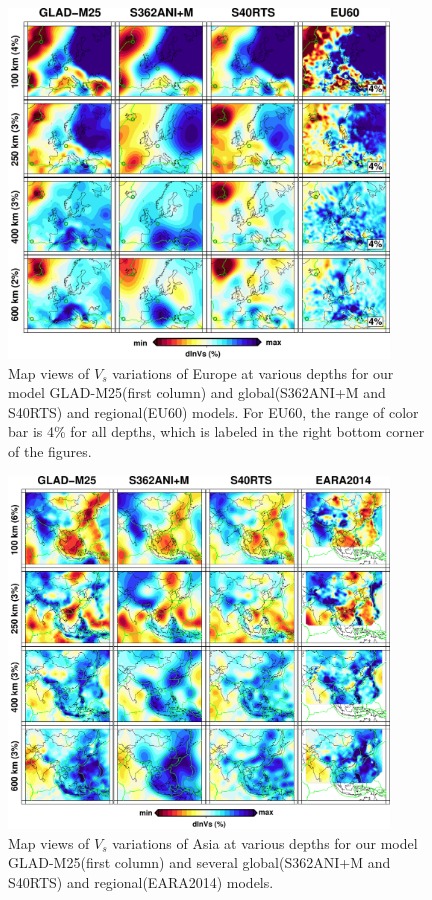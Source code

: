 \documentclass[extra,mreferee]{gji}
\begin{document}
\begin{figure}
\includegraphics[width=0.9\textwidth]{figures/depth_slice/europe_vs.pdf}
\caption{Map views of $V_s$ variations of Europe at various depths for our model GLAD-M25(first column) and global(S362ANI+M and S40RTS) and regional(EU60) models. For EU60, the range of color bar is 4\% for all depths, which is labeled in the right bottom corner of the figures.}
\label{fig:global-vp}
\centering
\end{figure}


\begin{figure}
\includegraphics[width=0.9\textwidth]{figures/depth_slice/asia_vs.pdf}
\caption{Map views of $V_s$ variations of Asia at various depths for our model GLAD-M25(first column) and several global(S362ANI+M and S40RTS) and regional(EARA2014) models.}
\label{fig:global-vp}
\centering
\end{figure}
\end{document}
